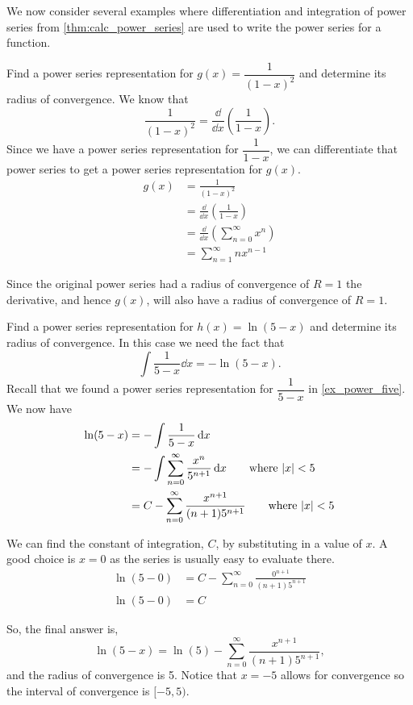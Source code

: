 We now consider several examples where differentiation and integration of power series from \autoref{thm:calc_power_series} are used to write the power series for a function. %

\begin{example}\label{ex_power_deriv}%
Find a power series representation for $g(x)=\dfrac1{(1-x)^2}$ and determine its radius of convergence.
\solution
We know that
\[\frac1{(1-x)^2} = \frac{\dd}{\dd x} \left( \frac{1}{1-x} \right).\]
Since we have a power series  representation for $\dfrac1{1-x}$, we can differentiate that power series to get a power series representation for $g(x)$.  
\begin{align*}
	g(x)
	& = \frac{1}{(1-x)^2} \\
    & = \frac{\dd}{\dd x} \left( \frac{1}{1-x} \right) \\
	& =  \frac{\dd}{\dd x} \left( \sum_{n=0}^{\infty} x^n \right)\\
    & =  \sum_{n=1}^{\infty} nx^{n-1}
\end{align*}

Since the original power series had a radius of convergence of $R=1$ the derivative, and hence $g(x)$, will also have a radius of convergence of $R=1$.
\end{example}

\begin{example}\label{ex_power_int}%
Find a power series representation for $h(x)=\ln(5-x)$ and determine its radius of convergence.
\solution
In this case we need the fact that
\[\int\frac1{5-x}\dd x=-\ln(5-x).\]
Recall that we found a power series representation for $\dfrac1{5-x}$ in \autoref{ex_power_five}. We now have
\begin{align*}
	\ln(5-x)
	& =  -\displaystyle\int \frac{1}{5-x}\operatorname{d}\! x \\
    & =  -\displaystyle\int \sum_{n=0}^{\infty} \frac{x^n}{5^{n+1}}\operatorname{d}\! x \qquad\text{where $\left\lvert x \right\rvert<5$}\\
	& =  C - \sum_{n=0}^{\infty} \frac{x^{n+1}}{(n+1)5^{n+1}} \qquad\text{where $\left\lvert x \right\rvert<5$}
\end{align*}

We can find the constant of integration, $C$, by substituting in a value of $x$.  A good choice is $x=0$ as the series is usually easy to evaluate there.  
\begin{align*}
	\ln(5-0) & = C - \sum_{n=0}^{\infty} \frac{0^{n+1}}{(n+1)5^{n+1}} \\
	\ln (5-0) & =  C 
\end{align*}

So, the final answer is, 
\[\ln(5-x) =\ln(5) - \sum_{n=0}^{\infty} \frac{x^{n+1}}{(n+1)5^{n+1}},\]
and the radius of convergence is 5. Notice that $x=-5$ allows for convergence so the interval of convergence is $[-5,5)$.
\end{example}


